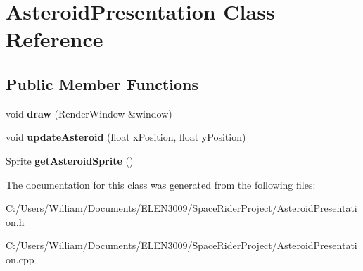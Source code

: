 \hypertarget{class_asteroid_presentation}{}\section{Asteroid\+Presentation Class Reference}
\label{class_asteroid_presentation}
\subsection*{Public Member Functions}
\begin{DoxyCompactItemize}
\item 
\mbox{\label{class_asteroid_presentation_ac35adcd9ce3dabdb0c34b8cbf14cce9c}} 
void {\bfseries draw} (Render\+Window \&window)
\item 
\mbox{\label{class_asteroid_presentation_a9af9a0a566030782f33f424c633227cc}} 
void {\bfseries update\+Asteroid} (float x\+Position, float y\+Position)
\item 
\mbox{\label{class_asteroid_presentation_ab1722869d573e4c6d3031033c6f74062}} 
Sprite {\bfseries get\+Asteroid\+Sprite} ()
\end{DoxyCompactItemize}


The documentation for this class was generated from the following files\+:\begin{DoxyCompactItemize}
\item 
C\+:/\+Users/\+William/\+Documents/\+E\+L\+E\+N3009/\+Space\+Rider\+Project/Asteroid\+Presentation.\+h\item 
C\+:/\+Users/\+William/\+Documents/\+E\+L\+E\+N3009/\+Space\+Rider\+Project/Asteroid\+Presentation.\+cpp\end{DoxyCompactItemize}
